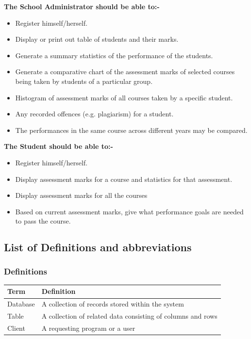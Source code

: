 \documentclass[10pt,onecolumn]{MainDocument}
\begin{document}
\textbf{The School Administrator should be able to:-}
\begin{itemize}
\item Register himself/herself.
\item Display or print out table of students and their marks.
\item Generate a summary statistics of the performance of the students. 
\item Generate a comparative chart of the assessment marks of selected courses being taken by students of a particular group. 
\item Histogram of assessment marks of all courses taken by a specific student.   
\item Any recorded offences (e.g. plagiarism) for a student.
\item The performances in the same course across different years may be compared.
\end{itemize}

\textbf{The Student should be able to:-}
\begin{itemize}
\item Register himself/herself.
\item Display assessment marks for a course and statistics for that assessment.
\item Display assessment marks for all the courses  
\item Based on current assessment marks, give what performance goals are needed to pass the course.
\end{itemize}

\subsection{List of Definitions and abbreviations}

\subsubsection{Definitions}
\begin{center}
    \begin{tabular}{ | p{3cm} | p{9cm} |}
\hline
\textbf{Term}& \textbf{Definition}\\ \hline
 Database & A collection of records stored within the system \\ \hline
 Table & A collection of related data consisting of columns and rows \\ \hline   
 Client & A requesting program or a user\\ \hline 
     \end{tabular}
\end{center}
\end{document}

